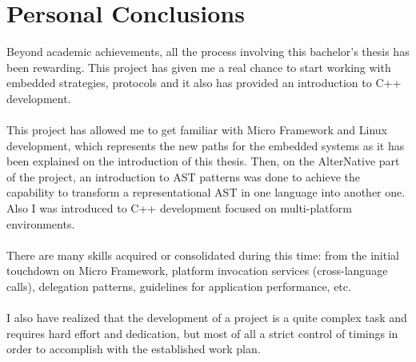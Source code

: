 \section{Personal Conclusions}\label{S:Personal-Conclusions}
Beyond academic achievements, all the process involving this bachelor's thesis has been rewarding. This project has given me a real chance to start working with embedded strategies, protocols and it also has provided an introduction to C++ development.
\\
\\
This project has allowed me to get familiar with Micro Framework and Linux development, which represents the new paths for the embedded systems as it has been explained on the introduction of this thesis. Then, on the AlterNative part of the project, an introduction to AST patterns was done to achieve the capability to transform a representational AST in one language into another one. Also I was introduced to C++ development focused on multi-platform environments.
\\
\\
There are many skills acquired or consolidated during this time: from the initial touchdown on Micro Framework, platform invocation services (cross-language calls), delegation patterns, guidelines for application performance, etc.
\\
\\
I also have realized that the development of a project is a quite complex task and requires hard effort and dedication, but most of all a strict control of timings in order to accomplish with the established work plan.

